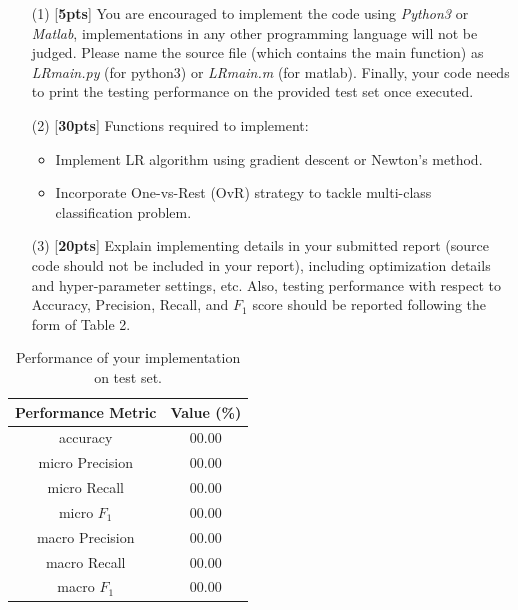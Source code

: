 \documentclass[11pt, a4paper, UTF8]{ctexart}
\begin{document}
\begin{enumerate}
	\item[(1)] [\textbf{5pts}] You are encouraged to implement the code using \emph{Python3} or \emph{Matlab}, implementations in any other programming language will not be judged. Please name the source file (which contains the main function) as \emph{LR\underline{\hspace{0.5em}}main.py} (for python3) or \emph{LR\underline{\hspace{0.5em}}main.m} (for matlab). Finally, your code needs to print the testing performance on the provided test set once executed.
	
	\item[(2)] [\textbf{30pts}] Functions required to implement:
	\begin{itemize}
		\item Implement LR algorithm using gradient descent or Newton's method.
		\item Incorporate One-vs-Rest (OvR) strategy to tackle multi-class classification problem.
	\end{itemize}
	\item[(3)] [\textbf{20pts}] Explain implementing details in your submitted report (source code should not be included in your report), including optimization details and hyper-parameter settings, etc. Also, testing performance with respect to Accuracy, Precision, Recall, and $F_1$ score should be reported following the form of Table 2.
\end{enumerate}

\begin{table}[h]
	\centering
	\caption{Performance of your implementation on test set.}
	\vspace{2mm}
	\label{tab:my_label}
	\begin{tabular}{|c|c|}
		\hline
		Performance Metric & Value (\%) \\
		\hline
		accuracy & 00.00 \\
		\hline
		micro Precision  & 00.00\\
		\hline
		micro Recall & 00.00\\
		\hline
		micro $F_1$ & 00.00\\
		\hline
		macro Precision  & 00.00\\
		\hline
		macro Recall & 00.00\\
		\hline
		macro $F_1$ & 00.00\\
		\hline
	\end{tabular}
	
\end{table}
\end{document}
